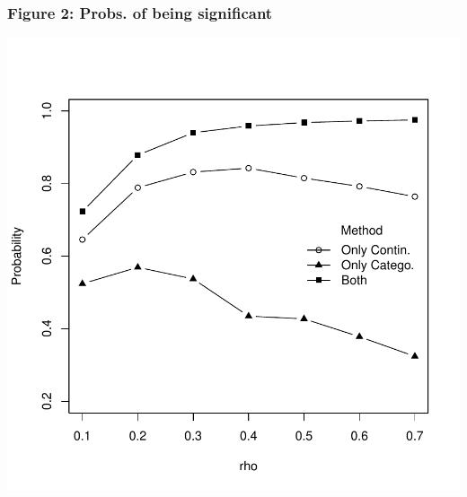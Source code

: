 \documentclass{article}
\begin{document}
\subsubsection*{Figure 2: Probs. of being significant}

\includegraphics{probabilities-t4}
\end{document}
